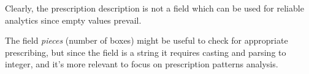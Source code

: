 Clearly, the prescription description is not a field which can be used for reliable analytics since empty values prevail.

The field \textit{pieces} (number of boxes) might be useful to check for appropriate prescribing, but since the field is a string it requires casting and parsing to integer, and it's more relevant to focus on prescription patterns analysis.


